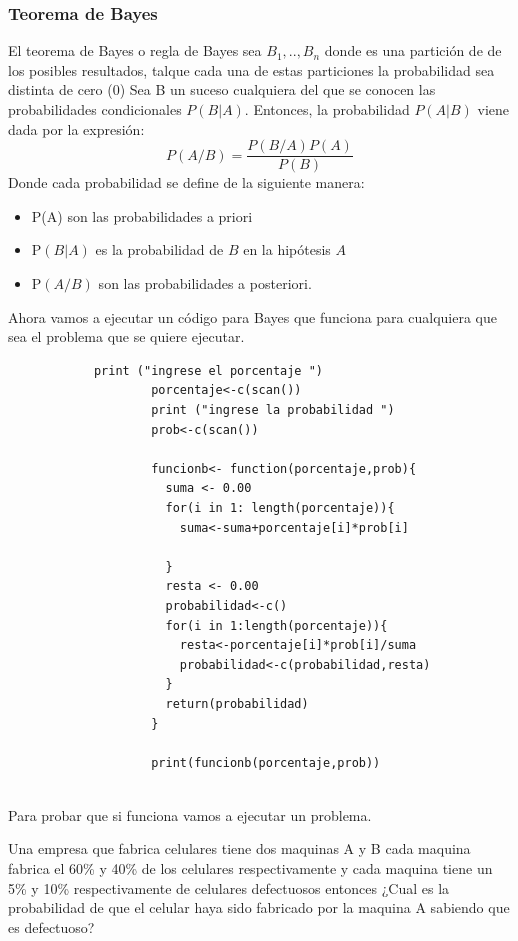 \documentclass[12pt,hidelinks]{article}
\begin{document}
		\subsubsection{Teorema de Bayes                  }
		    El teorema de Bayes o regla de Bayes sea $B_1,..,B_n$ donde es una partición de de los posibles resultados, talque cada una de estas particiones la probabilidad sea distinta de cero (0)  Sea B un suceso cualquiera del que se conocen las probabilidades condicionales  $P(B|A)$. Entonces, la probabilidad $P(A|B)$ viene dada por la expresión:
		    \[
		    P(A/B)=\frac{P(B/A)P(A)}{P(B)}
		    \]
		    Donde cada probabilidad se define de la siguiente manera:
		    \begin{itemize}
		        \item P(A) son las probabilidades a priori
		        \item P$(B|A)$ es la probabilidad de $B$ en la hipótesis $A$
		        \item P$(A/B)$ son las probabilidades a posteriori. 
		    \end{itemize}
		    Ahora vamos a ejecutar un código para Bayes que funciona para cualquiera que sea el problema que se quiere ejecutar.
		    \begin{lstlisting}
		    print ("ingrese el porcentaje ")
                    porcentaje<-c(scan())
                    print ("ingrese la probabilidad ")
                    prob<-c(scan())
                    
                    funcionb<- function(porcentaje,prob){
                      suma <- 0.00
                      for(i in 1: length(porcentaje)){
                        suma<-suma+porcentaje[i]*prob[i]
                      
                      }
                      resta <- 0.00
                      probabilidad<-c()
                      for(i in 1:length(porcentaje)){
                        resta<-porcentaje[i]*prob[i]/suma
                        probabilidad<-c(probabilidad,resta)
                      }
                      return(probabilidad)
                    }
                    
                    print(funcionb(porcentaje,prob))

		    \end{lstlisting}\\
		Para probar que si funciona vamos a ejecutar un problema.
		
		Una empresa que fabrica celulares tiene dos maquinas A y B cada maquina fabrica el 60\% y 40\% de los celulares respectivamente y cada maquina tiene un 5\% y 10\% respectivamente de celulares defectuosos entonces ¿Cual es la probabilidad de que el celular haya sido fabricado por la maquina A sabiendo que es defectuoso?
		
\end{document}
